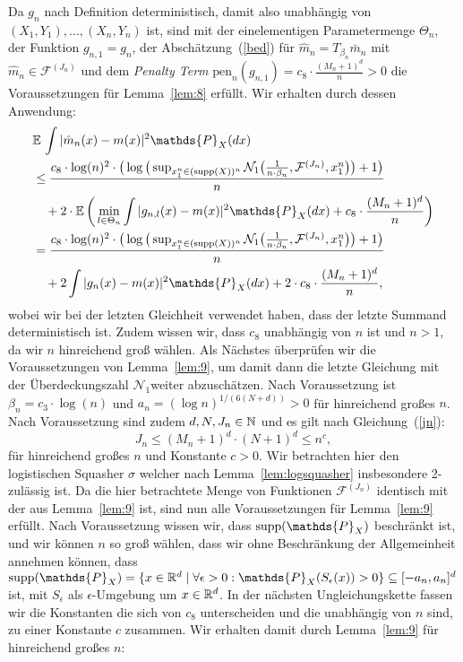 Da $g_n$ nach Definition deterministisch, damit also unabhängig von $(X_1, Y_1),\dots,(X_n, Y_n)$ ist, sind mit der einelementigen Parametermenge $\Theta_n$, der Funktion $g_{n,1} = g_n$, der Abschätzung~(\ref{bed}) für $\hat{m}_n = T_{\beta_n}\bar{m}_n$ mit $\hat{m}_n \in \mathcal{F}^{(J_n)}$ und dem \emph{Penalty Term} $\mathrm{pen}_n(g_{n,1}) = c_8 \cdot \frac{(M_n + 1)^d}{n} > 0$ die Voraussetzungen für Lemma~\ref{lem:8} erfüllt. Wir erhalten durch dessen Anwendung:
\begin{equation*}
\begin{split}
& \E \int |\hat{m}_n(x) - m(x)|^2 \mathds{P}_X(dx) \\
& \leq \frac{c_8 \cdot \log(n)^2 \cdot \big(\log\big(\sup_{x_1^n \in (\supp(X))^n}\mathcal{N}_1\big(\frac{1}{n \cdot \beta_n},\mathcal{F}^{(J_n)},x_1^n\big)\big) + 1\big)}{n} \\
& \quad + 2 \cdot \E\bigg(\min_{l \in \Theta_n} \int |g_{n,l}(x) - m(x)|^2 \mathds{P}_X(dx) + c_8 \cdot \frac{(M_n + 1)^d}{n}\bigg) \\
& = \frac{c_8 \cdot \log(n)^2 \cdot \big(\log\big(\sup_{x_1^n \in (\supp(X))^n}\mathcal{N}_1\big(\frac{1}{n \cdot \beta_n},\mathcal{F}^{(J_n)},x_1^n\big)\big) + 1\big)}{n} \\
& \quad + 2 \int |g_{n}(x) - m(x)|^2 \mathds{P}_X(dx) + 2 \cdot c_8 \cdot \frac{(M_n + 1)^d}{n},
\end{split}
\end{equation*}
wobei wir bei der letzten Gleichheit verwendet haben, dass der letzte Summand deterministisch ist. Zudem wissen wir, dass $c_8$ unabhängig von $n$ ist und $n > 1$, da wir $n$ hinreichend groß wählen.
Als Nächstes überprüfen wir die Voraussetzungen von Lemma~\ref{lem:9}, um damit dann die letzte Gleichung mit der Überdeckungszahl $\mathcal{N}_1$weiter abzuschätzen.
Nach Voraussetzung ist $\beta_n = c_3 \cdot \log(n)$ und $a_n = (\log n)^{1/(6(N + d))} > 0$ für hinreichend großes $n$. Nach Voraussetzung sind zudem $d, N, J_n \in \mathbb{N}$ und es gilt nach Gleichung~(\ref{jn}): 
$$J_n \leq (M_n + 1)^d \cdot (N + 1)^d \leq n^{c},$$
für hinreichend großes $n$ und Konstante $c > 0$. Wir betrachten hier den logistischen Squasher $\sigma$ welcher nach Lemma~\ref{lem:logsquasher} insbesondere 2-zulässig ist. Da die hier betrachtete Menge von Funktionen $\mathcal{F}^{(J_n)}$ identisch mit der aus Lemma~\ref{lem:9} ist, sind nun alle Voraussetzungen für Lemma~\ref{lem:9} erfüllt. Nach Voraussetzung wissen wir, dass $\supp(\mathds{P}_X)$ beschränkt ist, und wir können $n$ so groß wählen, dass wir ohne Beschränkung der Allgemeinheit annehmen können, dass $\supp(\mathds{P}_X) = \{x \in \R^d \mid \forall \epsilon > 0 : \mathds{P}_X(S_{\epsilon}(x)) > 0\} \subseteq [-a_n, a_n]^d$ ist, mit $S_{\epsilon}$ als $\epsilon$-Umgebung um $x \in \mathbb{R}^d$. In der nächsten Ungleichungskette fassen wir die Konstanten die sich von $c_8$ unterscheiden und die unabhängig von $n$ sind, zu einer Konstante $c$ zusammen. Wir erhalten damit durch Lemma~\ref{lem:9} für hinreichend großes $n$:
